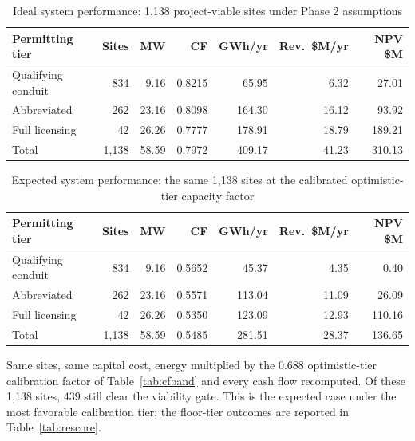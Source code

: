 \documentclass[12pt,letterpaper]{report}
\begin{document}
\begin{table}[htbp]
\centering
\caption{Ideal system performance: 1,138 project-viable sites under Phase 2
assumptions}
\label{tab:ideal}
\footnotesize
\begin{tabular}{@{}lrrrrrr@{}}
\toprule
Permitting tier & Sites & MW & CF & GWh/yr & Rev.\ \$M/yr & NPV \$M \\
\midrule
Qualifying conduit  & 834     & 9.16  & 0.8215 & 65.95  & 6.32  & 27.01  \\
Abbreviated         & 262     & 23.16 & 0.8098 & 164.30 & 16.12 & 93.92  \\
Full licensing      & 42      & 26.26 & 0.7777 & 178.91 & 18.79 & 189.21 \\
\midrule
Total               & 1{,}138 & 58.59 & 0.7972 & 409.17 & 41.23 & 310.13 \\
\bottomrule
\end{tabular}
\end{table}

\begin{table}[htbp]
\centering
\caption{Expected system performance: the same 1,138 sites at the calibrated
optimistic-tier capacity factor}
\label{tab:expected}
\footnotesize
\begin{tabular}{@{}lrrrrrr@{}}
\toprule
Permitting tier & Sites & MW & CF & GWh/yr & Rev.\ \$M/yr & NPV \$M \\
\midrule
Qualifying conduit  & 834     & 9.16  & 0.5652 & 45.37  & 4.35  & 0.40   \\
Abbreviated         & 262     & 23.16 & 0.5571 & 113.04 & 11.09 & 26.09  \\
Full licensing      & 42      & 26.26 & 0.5350 & 123.09 & 12.93 & 110.16 \\
\midrule
Total               & 1{,}138 & 58.59 & 0.5485 & 281.51 & 28.37 & 136.65 \\
\bottomrule
\end{tabular}

\vspace{0.4em}
{\footnotesize Same sites, same capital cost, energy multiplied by the 0.688
optimistic-tier calibration factor of Table~\ref{tab:cfband} and every cash flow
recomputed. Of these 1,138 sites, 439 still clear the viability gate. This is the
expected case under the most favorable calibration tier; the floor-tier outcomes
are reported in Table~\ref{tab:rescore}.}
\end{table}
\end{document}
